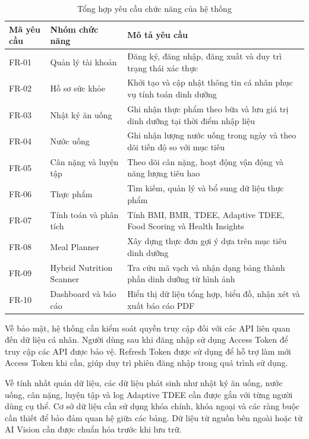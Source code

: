 \begin{table}[H]
\centering
\caption{Tổng hợp yêu cầu chức năng của hệ thống}
\begin{tabular}{|p{4cm}|p{5.5cm}|p{5.5cm}|}
\hline
\textbf{Mã yêu cầu} & \textbf{Nhóm chức năng} & \textbf{Mô tả yêu cầu} \\ \hline
FR-01 & Quản lý tài khoản & Đăng ký, đăng nhập, đăng xuất và duy trì trạng thái xác thực \\ \hline
FR-02 & Hồ sơ sức khỏe & Khởi tạo và cập nhật thông tin cá nhân phục vụ tính toán dinh dưỡng \\ \hline
FR-03 & Nhật ký ăn uống & Ghi nhận thực phẩm theo bữa và lưu giá trị dinh dưỡng tại thời điểm nhập liệu \\ \hline
FR-04 & Nước uống & Ghi nhận lượng nước uống trong ngày và theo dõi tiến độ so với mục tiêu \\ \hline
FR-05 & Cân nặng và luyện tập & Theo dõi cân nặng, hoạt động vận động và năng lượng tiêu hao \\ \hline
FR-06 & Thực phẩm & Tìm kiếm, quản lý và bổ sung dữ liệu thực phẩm \\ \hline
FR-07 & Tính toán và phân tích & Tính BMI, BMR, TDEE, Adaptive TDEE, Food Scoring và Health Insights \\ \hline
FR-08 & Meal Planner & Xây dựng thực đơn gợi ý dựa trên mục tiêu dinh dưỡng \\ \hline
FR-09 & Hybrid Nutrition Scanner & Tra cứu mã vạch và nhận dạng bảng thành phần dinh dưỡng từ hình ảnh \\ \hline
FR-10 & Dashboard và báo cáo & Hiển thị dữ liệu tổng hợp, biểu đồ, nhận xét và xuất báo cáo PDF \\ \hline
\end{tabular}
\end{table}

Về bảo mật, hệ thống cần kiểm soát quyền truy cập đối với các API liên quan đến dữ liệu cá nhân. Người dùng sau khi đăng nhập sử dụng Access Token để truy cập các API được bảo vệ. Refresh Token được sử dụng để hỗ trợ làm mới Access Token khi cần, giúp duy trì phiên đăng nhập trong quá trình sử dụng.

Về tính nhất quán dữ liệu, các dữ liệu phát sinh như nhật ký ăn uống, nước uống, cân nặng, luyện tập và log Adaptive TDEE cần được gắn với từng người dùng cụ thể. Cơ sở dữ liệu cần sử dụng khóa chính, khóa ngoại và các ràng buộc cần thiết để bảo đảm quan hệ giữa các bảng. Dữ liệu từ nguồn bên ngoài hoặc từ AI Vision cần được chuẩn hóa trước khi lưu trữ.

